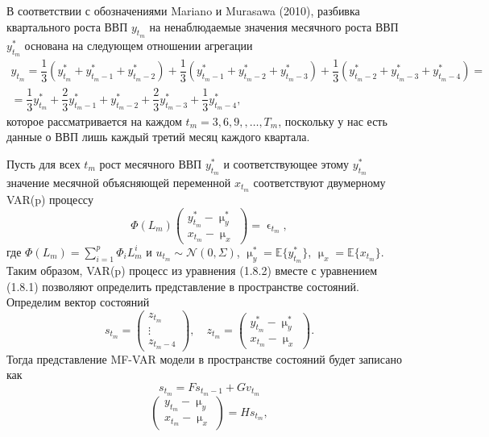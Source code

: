 \documentclass[a4paper, 12pt]{extarticle}
\numberwithin{equation}{subsection}
\renewcommand{\mu}{\upmu}
\renewcommand{\epsilon}{\upvarepsilon}
\begin{document}
	В соответствии с обозначениями Mariano и Murasawa (2010), разбивка квартального роста ВВП $y_{t_m}$ на ненаблюдаемые значения месячного роста ВВП $y^*_{t_m}$ основана на следующем отношении агрегации
	\begin{multline}
		y_{t_m} = \dfrac{1}{3}(y^*_{t_m} + y^*_{t_m-1} + y^*_{t_m-2}) + \dfrac{1}{3}(y^*_{t_m-1} + y^*_{t_m-2} + y^*_{t_m-3}) + \dfrac{1}{3}(y^*_{t_m-2} + y^*_{t_m-3} + y^*_{t_m-4}) =\\= \dfrac{1}{3} y^*_{t_m} + \dfrac{2}{3} y^*_{t_m-1} + y^*_{t_m-2} + \dfrac{2}{3} y^*_{t_m-3} + \dfrac{1}{3} y^*_{t_m-4},
	\end{multline}
	которое рассматривается на каждом $t_m = 3,6,9,,\ldots, T_m$, поскольку у нас есть данные о ВВП лишь каждый третий месяц каждого квартала. 
	
	Пусть для всех $t_m$ рост месячного ВВП $y^*_{t_m}$ и соответствующее этому $y^*_{t_m}$ значение месячной объясняющей переменной $x_{t_m}$ соответствуют двумерному VAR(p) процессу
	\begin{equation}
		\Phi(L_m)\begin{pmatrix}
		y^*_{t_m} - \mu_y^*\\
		x_{t_m} - \mu_x
	\end{pmatrix} = \epsilon_{t_m},
	\end{equation}
	где $\Phi(L_m) = \sum_{i=1}^{p}\Phi_i L_m^i$ и $u_{t_m}\sim \mathcal{N}(0, \Sigma)$, $\mu^*_y = \mathbb{E}\{y_{t_m}^*\}$, $\mu_x = \mathbb{E}\{x_{t_m}\}$.
	Таким образом, VAR(p) процесс из уравнения (1.8.2) вместе с уравнением (1.8.1) позволяют определить представление в пространстве состояний. Определим вектор состояний 
	\begin{equation}
		s_{t_m} = \begin{pmatrix}
		z_{t_m} \\ \vdots \\ z_{t_m - 4}
	\end{pmatrix},\quad z_{t_m} = \begin{pmatrix}
		y^*_{t_m} - \mu_y^*\\
		x_{t_m} - \mu_x
	\end{pmatrix}.
	\end{equation}
	Тогда представление MF-VAR модели в пространстве состояний будет записано как 
	\begin{equation}
		s_{t_m} = Fs_{t_m-1} + G v_{t_m}
	\end{equation}
	\begin{equation}
		\begin{pmatrix}
		y_{t_m} - \mu_y\\
		x_{t_m} - \mu_x
	\end{pmatrix} = Hs_{t_m},
	\end{equation}
\end{document}
